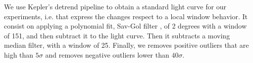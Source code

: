 We use Kepler's detrend pipeline \citep{fanelli2011kepler} to obtain a standard light curve for our experiments, i.e. that express the changes respect to a local window behavior. It consist on applying
a polynomial fit, Sav-Gol filter \citep{savitzky1964smoothing}, of 2 degrees with a window of 151, and then subtract it to the light curve. Then it
subtracts a moving median filter, with a window of 25.
Finally, we removes
positive outliers that are high than $5\sigma$ and removes negative outliers lower than $40 \sigma$. 


